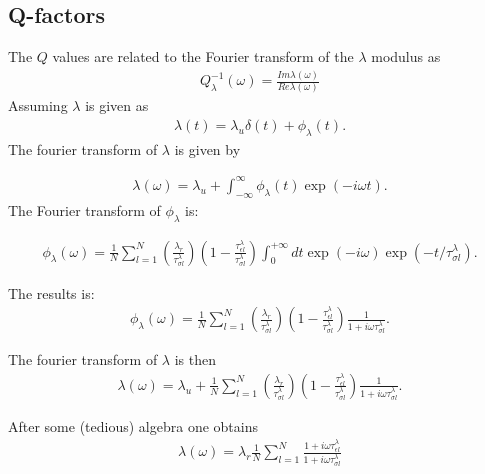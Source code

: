 \documentclass[11pt]{article}
\begin{document}
\subsection*{Q-factors}
The $Q$ values are related to the Fourier transform of the $\lambda$ modulus as
\begin{eqnarray}
  Q^{-1}_{\lambda}(\omega) = \frac{Im \lambda(\omega)}{Re \lambda(\omega)}
\end{eqnarray}
Assuming $\lambda$ is given as
\begin{eqnarray}
\lambda(t) = \lambda_u\delta(t) + \phi_{\lambda}(t).
\end{eqnarray}
The fourier transform of $\lambda$ is given by

\begin{eqnarray}
\lambda(\omega) = \lambda_u + \int_{-\infty}^{\infty} \phi_{\lambda}(t) \exp(-i\omega t).
\end{eqnarray}
The Fourier transform of $\phi_\lambda$ is:

\begin{eqnarray}
\phi_{\lambda}(\omega)=  \frac{1}{N}\sum_{l=1}^N\left(\frac{\lambda_r}{\tau^{\lambda}_{\sigma l}}\right) 
            \left(1-\frac{\tau^{\lambda}_{\epsilon l}}{\tau^{\lambda}_{\sigma l}}\right)
           \int^{+\infty}_0 dt\exp(-i\omega)\exp(-t/\tau^{\lambda}_{\sigma l}).
\end{eqnarray}

The results is:
\begin{eqnarray}
\phi_{\lambda}(\omega)=  \frac{1}{N}\sum_{l=1}^N\left(\frac{\lambda_r}{\tau^{\lambda}_{\sigma l}}\right) 
            \left(1-\frac{\tau^{\lambda}_{\epsilon l}}{\tau^{\lambda}_{\sigma l}} \right)\frac{1}{1+i\omega\tau^{\lambda}_{\sigma l}}.
\end{eqnarray}

The fourier transform of $\lambda$ is then
\begin{eqnarray}
\lambda(\omega) = \lambda_u 
+\frac{1}{N}\sum_{l=1}^N\left(\frac{\lambda_r}{\tau^{\lambda}_{\sigma l}}\right) 
            \left(1-\frac{\tau^{\lambda}_{\epsilon l}}{\tau^{\lambda}_{\sigma l}} \right)\frac{1}{1+i\omega\tau^{\lambda}_{\sigma l}}.
\end{eqnarray}

After some (tedious) algebra one obtains
\begin{eqnarray}
\lambda(\omega) = \lambda_r \frac{1}{N}\sum_{l=1}^N\frac{1+i\omega\tau^{\lambda}_{\epsilon l}}{1+i\omega\tau^{\lambda}_{\sigma l}} 
\end{eqnarray}
\end{document}
